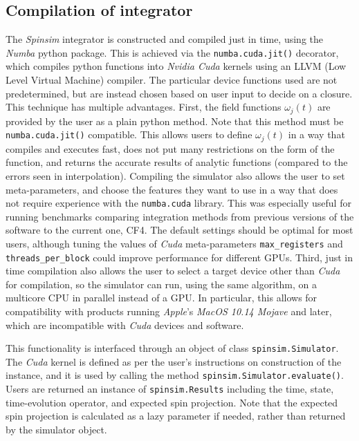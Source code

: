 \documentclass{jors}
\begin{document}
	\subsection{Compilation of integrator}
		The \emph{Spinsim} integrator is constructed and compiled just in time, using the \emph{Numba}\cite{lam_numba_2015} python package.
		This is achieved via the \texttt{numba.cuda.jit()} decorator, which compiles python functions into \emph{Nvidia Cuda}\cite{nickolls_scalable_2008} kernels using an LLVM\cite{lattner_llvm_2004} (Low Level Virtual Machine) compiler.
		The particular device functions used are not predetermined, but are instead chosen based on user input to decide on a closure.
		This technique has multiple advantages.
		First, the field functions $ \omega_j(t) $ are provided by the user as a plain python method.
		Note that this method must be \texttt{numba.cuda.jit()} compatible.
		This allows users to define $ \omega_j(t) $ in a way that compiles and executes fast, does not put many restrictions on the form of the function, and returns the accurate results of analytic functions (compared to the errors seen in interpolation).
		Compiling the simulator also allows the user to set meta-parameters, and choose the features they want to use in a way that does not require experience with the \texttt{numba.cuda} library.
		This was especially useful for running benchmarks comparing integration methods from previous versions of the software to the current one, CF4.
		The default settings should be optimal for most users, although tuning the values of \emph{Cuda} meta-parameters \texttt{max\_registers} and \texttt{threads\_per\_block} could improve performance for different GPUs.
		Third, just in time compilation also allows the user to select a target device other than \emph{Cuda} for compilation, so the simulator can run, using the same algorithm, on a multicore CPU in parallel instead of a GPU.
		In particular, this allows for compatibility with products running \emph{Apple}'s \emph{MacOS 10.14 Mojave} and later, which are incompatible with \emph{Cuda} devices and software.
		
		This functionality is interfaced through an object of class \texttt{spinsim.Simulator}.
		The \emph{Cuda} kernel is defined as per the user’s instructions on construction of the instance, and it is used by calling the method \texttt{spinsim.Simulator.evaluate()}.
		Users are returned an instance of \texttt{spinsim.Results} including the time, state, time-evolution operator, and expected spin projection.
		Note that the expected spin projection is calculated as a lazy parameter if needed, rather than returned by the simulator object.
\end{document}
